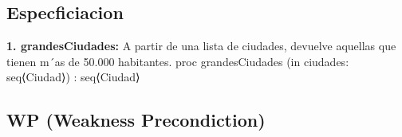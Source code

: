 \documentclass[10pt,a4paper]{article}
\begin{document}
\maketitle
\subsection{Especficiacion}
\textbf{1. grandesCiudades: }  A partir de una lista de ciudades, devuelve aquellas que tienen m´as de 50.000 habitantes.
	proc grandesCiudades (in ciudades: seq⟨Ciudad⟩) : seq⟨Ciudad⟩

\subsection{WP (Weakness Precondiction)}
\end{document}
